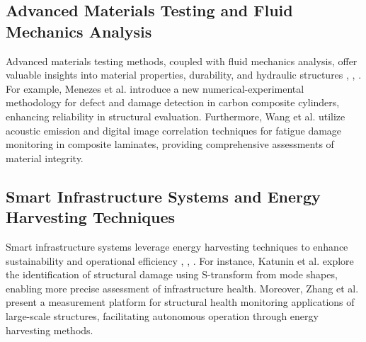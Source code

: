 \documentclass[journal, a4paper]{IEEEtran}
\begin{document}
\subsection{Advanced Materials Testing and Fluid Mechanics Analysis}
Advanced materials testing methods, coupled with fluid mechanics analysis, offer valuable insights into material properties, durability, and hydraulic structures \cite{katunin_identification_2021}, \cite{katunin_modeling_2021}, \cite{wang_fatigue_2023}. For example, Menezes et al. \cite{katunin_identification_2021} introduce a new numerical-experimental methodology for defect and damage detection in carbon composite cylinders, enhancing reliability in structural evaluation. Furthermore, Wang et al. \cite{wang_fatigue_2023} utilize acoustic emission and digital image correlation techniques for fatigue damage monitoring in composite laminates, providing comprehensive assessments of material integrity.


\subsection{Smart Infrastructure Systems and Energy Harvesting Techniques}
Smart infrastructure systems leverage energy harvesting techniques to enhance sustainability and operational efficiency \cite{katunin_modeling_2021}, \cite{tabjula_sparse_2023}, \cite{han_crack_2021}. For instance, Katunin et al. \cite{katunin_modeling_2021} explore the identification of structural damage using S-transform from mode shapes, enabling more precise assessment of infrastructure health. Moreover, Zhang et al. \cite{tabjula_sparse_2023} present a measurement platform for structural health monitoring applications of large-scale structures, facilitating autonomous operation through energy harvesting methods.
\end{document}
